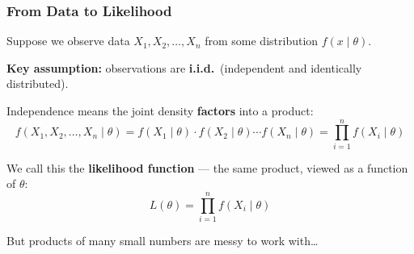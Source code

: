 \documentclass[aspectratio=169]{beamer}
\begin{document}
\begin{frame}
\frametitle{From Data to Likelihood}

\small
Suppose we observe data $X_1, X_2, \ldots, X_n$ from some distribution $f(x \mid \theta)$.

\vspace{0.2cm}
\textbf{Key assumption:} observations are \textbf{i.i.d.}\ (independent and identically distributed).

\pause
\vspace{0.15cm}
Independence means the joint density \textbf{factors} into a product:
$$f(X_1, X_2, \ldots, X_n \mid \theta) = f(X_1 \mid \theta) \cdot f(X_2 \mid \theta) \cdots f(X_n \mid \theta) = \prod_{i=1}^n f(X_i \mid \theta)$$

\pause
\vspace{0.1cm}
We call this the \textbf{likelihood function} --- the same product, viewed as a function of $\theta$:
$$L(\theta) = \prod_{i=1}^n f(X_i \mid \theta)$$

\vspace{0.1cm}
\begin{center}
\end{center}

\vspace{0.1cm}
\centering But products of many small numbers are messy to work with\ldots
\end{frame}
\end{document}
